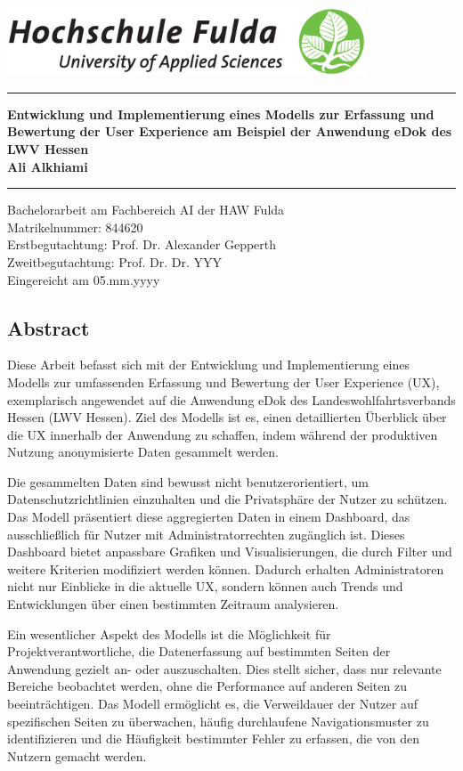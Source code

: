\documentclass[12pt,oneside]{article}
\newcommand{\HSFTitle}[8]{

  \thispagestyle{empty}
\begin{center}
    \includegraphics[width=0.8\textwidth]{logo.eps} \\
    \vspace*{\stretch{1}}
\end{center}

  {\parindent0cm
  \rule{\linewidth}{.7ex}}
  \begin{center}
    \vspace*{\stretch{1}}
    \sffamily\bfseries\Huge
    #1\\
    \vspace*{\stretch{1}}
    \sffamily\bfseries\large
    #3
    \vspace*{\stretch{1}}
  \end{center}
  \rule{\linewidth}{.7ex}

  \vspace*{\stretch{2}}
  \begin{center}
    \Large #2 am #5 der HAW Fulda \\
    \vspace*{\stretch{1}} 
    \large Matrikelnummer:  #4 \\[1mm]
    \large Erstbegutachtung:  #7 \\[1mm]
    \large Zweitbegutachtung:  #8 \\[1mm]
    \vspace*{\stretch{1}}
    \large Eingereicht am #6
  \end{center}
}
\begin{document}
 
 

 \HSFTitle
      {Entwicklung und Implementierung eines Modells zur Erfassung und Bewertung der User Experience am Beispiel der Anwendung eDok des LWV Hessen }        %
      {Bachelorarbeit} %
      {Ali Alkhiami}          %
      {844620}
      {Fachbereich AI}  %
      {05.mm.yyyy}        %
      {Prof. Dr. Alexander Gepperth}     %
      {Prof. Dr. Dr. YYY}    %

  \clearpage

\lhead{}
    \setcounter{page}{1}
 

\subsection{Abstract}

Diese Arbeit befasst sich mit der Entwicklung und Implementierung eines Modells zur umfassenden Erfassung und Bewertung der User Experience (UX), exemplarisch angewendet auf die Anwendung eDok des Landeswohlfahrtsverbands Hessen (LWV Hessen). Ziel des Modells ist es, einen detaillierten Überblick über die UX innerhalb der Anwendung zu schaffen, indem während der produktiven Nutzung anonymisierte Daten gesammelt werden.

Die gesammelten Daten sind bewusst nicht benutzerorientiert, um Datenschutzrichtlinien einzuhalten und die Privatsphäre der Nutzer zu schützen. Das Modell präsentiert diese aggregierten Daten in einem Dashboard, das ausschließlich für Nutzer mit Administratorrechten zugänglich ist. Dieses Dashboard bietet anpassbare Grafiken und Visualisierungen, die durch Filter und weitere Kriterien modifiziert werden können. Dadurch erhalten Administratoren nicht nur Einblicke in die aktuelle UX, sondern können auch Trends und Entwicklungen über einen bestimmten Zeitraum analysieren.

Ein wesentlicher Aspekt des Modells ist die Möglichkeit für Projektverantwortliche, die Datenerfassung auf bestimmten Seiten der Anwendung gezielt an- oder auszuschalten. Dies stellt sicher, dass nur relevante Bereiche beobachtet werden, ohne die Performance auf anderen Seiten zu beeinträchtigen. Das Modell ermöglicht es, die Verweildauer der Nutzer auf spezifischen Seiten zu überwachen, häufig durchlaufene Navigationsmuster zu identifizieren und die Häufigkeit bestimmter Fehler zu erfassen, die von den Nutzern gemacht werden.
\end{document}
